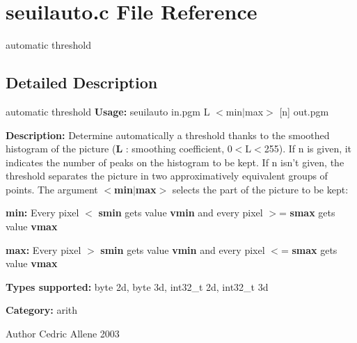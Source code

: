 \section{seuilauto.c File Reference}
\label{seuilauto_8c}


automatic threshold  




\subsection{Detailed Description}
automatic threshold {\bfseries Usage:} seuilauto in.pgm L $<$min$|$max$>$ [n] out.pgm

{\bfseries Description:} Determine automatically a threshold thanks to the smoothed histogram of the picture ({\bfseries L} : smoothing coefficient, 0$<$L$<$255). If n is given, it indicates the number of peaks on the histogram to be kept. If n isn't given, the threshold separates the picture in two approximatively equivalent groups of points. The argument {\bfseries $<$min$|$max$>$} selects the part of the picture to be kept:

\begin{DoxyItemize}
\item {\bfseries min:} Every pixel $<$ {\bfseries smin} gets value {\bfseries vmin} and every pixel $>$= {\bfseries smax} gets value {\bfseries vmax} \item {\bfseries max:} Every pixel $>$ {\bfseries smin} gets value {\bfseries vmin} and every pixel $<$= {\bfseries smax} gets value {\bfseries vmax} \end{DoxyItemize}
{\bfseries Types supported:} byte 2d, byte 3d, int32\_\-t 2d, int32\_\-t 3d

{\bfseries Category:} arith

\begin{DoxyAuthor}{Author}
Cedric Allene 2003 
\end{DoxyAuthor}
